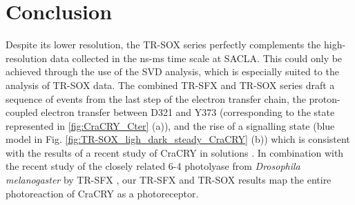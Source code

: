 \section{Conclusion}

Despite its lower resolution, the TR-SOX series perfectly complements the high-resolution data collected in the ns-ms time scale at SACLA. This could only be achieved through the use of the SVD analysis, which is especially suited to the analysis of TR-SOX data. The combined TR-SFX and TR-SOX series draft a sequence of events from the last step of the electron transfer chain, the proton-coupled electron transfer between D321 and Y373 (corresponding to the state represented in \ref{fig:CraCRY_Cter} (a)), and the rise of a signalling state (blue model in Fig. \ref{fig:TR-SOX_ligh_dark_steady_CraCRY} (b)) which is consistent with the results of a recent study of CraCRY in solutions \parencite{zanglTimeResolvedIonMobility2024}. In combination with the recent study of the closely related 6-4 photolyase from \textit{Drosophila melanogaster} by TR-SFX \parencite{celliniDirectedUltrafastConformational2024}, our TR-SFX and TR-SOX results map the entire photoreaction of CraCRY as a photoreceptor. 